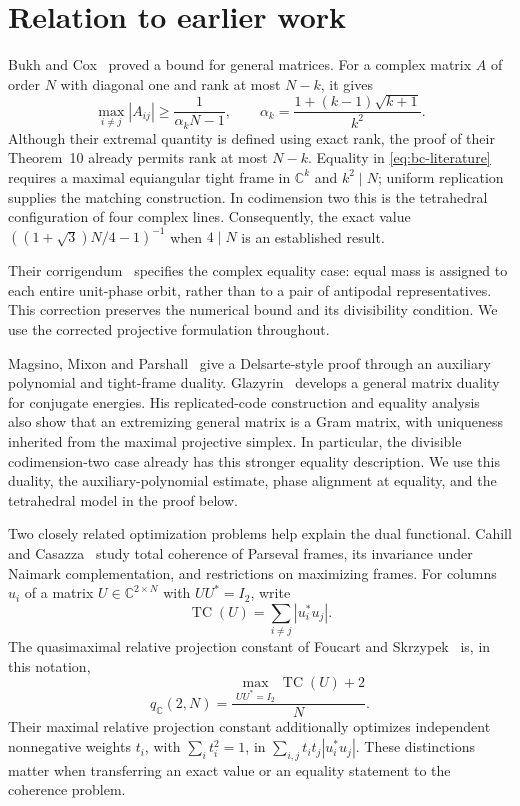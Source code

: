 \section{Relation to earlier work}\label{sec:related}

Bukh and Cox~\cite[Theorems~2(b) and~3(b)]{BC} proved a bound for general
matrices. For a complex matrix $A$ of order
$N$ with diagonal one and rank at most $N-k$, it gives
\begin{equation}\label{eq:bc-literature}
 \max_{i\ne j}|A_{ij}|\geq\frac{1}{\alpha_kN-1},
 \qquad
 \alpha_k=\frac{1+(k-1)\sqrt{k+1}}{k^2}.
\end{equation}
Although their extremal quantity is defined using exact rank, the proof
of their Theorem~10 already permits rank at most $N-k$. Equality in
\eqref{eq:bc-literature} requires a maximal equiangular tight frame in
$\mathbb C^k$ and $k^2\mid N$; uniform replication supplies the matching
construction. In codimension two this is the tetrahedral configuration
of four complex lines. Consequently, the exact value
$((1+\sqrt3)N/4-1)^{-1}$ when $4\mid N$ is an established result.

Their corrigendum~\cite{BCErratum} specifies the complex equality case:
equal mass is assigned to each entire
unit-phase orbit, rather than to a pair of antipodal representatives.
This correction preserves the numerical bound and its divisibility
condition. We use the corrected projective formulation throughout.

Magsino, Mixon and Parshall~\cite[Lemma~1 and Theorem~4]{MMP} give a
Delsarte-style proof through an auxiliary polynomial and tight-frame
duality. Glazyrin~\cite[Theorem~7]{Glazyrin} develops a general matrix
duality for conjugate energies. His replicated-code construction and
equality analysis~\cite[Theorem~10 and the subsequent discussion]{Glazyrin}
also show that an extremizing general matrix is a Gram matrix, with
uniqueness inherited from the maximal projective simplex. In particular,
the divisible codimension-two case already has this stronger equality
description. We use this duality, the auxiliary-polynomial estimate,
phase alignment at equality, and the tetrahedral model in the proof below.

Two closely related optimization problems help explain the dual
functional. Cahill and Casazza~\cite[Proposition~2.1 and Theorems~2.2,
2.4]{CahillCasazza} study total coherence of Parseval frames, its
invariance under Naimark complementation, and restrictions on maximizing
frames. For columns $u_i$ of a matrix $U\in\mathbb C^{2\times N}$ with
$UU^*=I_2$, write
\[
 \operatorname{TC}(U)=\sum_{i\ne j}|u_i^*u_j|.
\]
The quasimaximal relative projection constant of Foucart and
Skrzypek~\cite[Section~2]{FoucartSkrzypek} is, in this notation,
\[
 q_{\mathbb C}(2,N)
 =\frac{\max_{UU^*=I_2}\operatorname{TC}(U)+2}{N}.
\]
Their maximal relative projection constant additionally optimizes
independent nonnegative weights $t_i$, with $\sum_i t_i^2=1$, in
$\sum_{i,j}t_it_j|u_i^*u_j|$. These distinctions matter when transferring
an exact value or an equality statement to the coherence problem.

